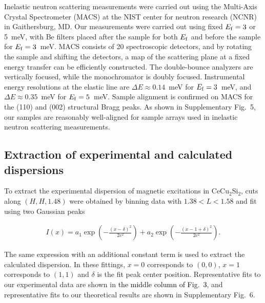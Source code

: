 \documentclass[aps,prl,onecolumn,amsmath,amssymb,superscriptaddress]{revtex4}
\newcommand{\ys}{\textcolor{black}}
\begin{document}
Inelastic neutron scattering measurements were carried out using the Multi-Axis Crystal Spectrometer (MACS) \cite{JRodriguez} at the NIST center for neutron research (NCNR) in Gaithersburg, MD. Our measurements were carried out using fixed $E_{\rm f}=3$ or 5~meV, with Be filters placed after the sample for both $E_{\rm f}$ and before the sample for $E_{\rm f}=3$~meV. MACS consists of 20 spectroscopic detectors, and by rotating the sample and shifting the detectors, a map of the scattering plane at a fixed energy transfer can be efficiently constructed. The double-bounce analyzers are vertically focused, while the monochromator is doubly focused. Instrumental energy resolutions at the elastic line are $\Delta E\approx0.14$~meV for $E_{\rm f}=3$~meV, and $\Delta E\approx0.35$~meV for $E_{\rm f}=5$~meV. Sample alignment is confirmed on MACS for the (110) and (002) structural Bragg peaks. As shown in Supplementary Fig.~5, our samples are reasonably well-aligned for sample arrays used in inelastic neutron scattering measurements. 

\subsection{Extraction of experimental and calculated dispersions}
To extract the experimental dispersion of magnetic excitations in CeCu$_2$Si$_2$, cuts along $(H,H,1.48)$ were obtained by binning data with $1.38<L<1.58$ and fit using two Gaussian peaks

\begin{align}	
	I(x)=a_1\exp(-\frac{(x-\delta)^2}{2c^2})+a_2\exp(-\frac{(x-1+\delta)^2}{2c^2}).	
\end{align}

The same expression with an additional constant term is used to extract the calculated dispersion. In these fittings, $x=0$ corresponds to $(0,0)$, $x=1$ corresponds to $(1,1)$ and $\delta$ is the fit peak center position. Representative fits to our experimental data are shown in \ys{the middle column of Fig.~3}, and representative fits to our theoretical results are shown in Supplementary Fig.~6.

\end{document}
